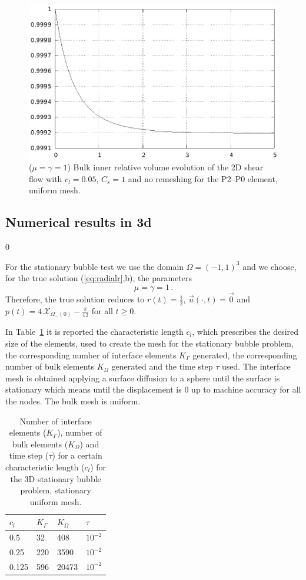 \documentclass[a4paper,12pt,onecolumn]{article}
\newcommand{\bigchi}{\ensuremath{\mathrm{\mathcal{X}}}}
\newcommand{\charfcn}[1]{\bigchi_{#1}} %
\begin{document}
\begin{figure}[htbp]
  \centering
  \includegraphics[width=.45\textwidth]{figures/2d_shear_smooth_bulk_inner_volume.ps}
  \caption{($\mu=\gamma=1$) Bulk inner relative volume evolution of the 2D shear flow with $c_l=0.05$, $C_s=1$ and no remeshing for the P2--P0 element, uniform mesh.}
  \label{fig:shear_2d_smooth_bulk_inner_volume}
\end{figure}

\subsection{Numerical results in 3d} \label{subsec:numerical_results_3d}
\setcounter{equation} 0

For the stationary bubble test we use the domain $\Omega = (-1,1)^3$ and we choose, for the true solution (\ref{eq:radialr},b), the parameters
\begin{equation*}
\mu = \gamma = 1\,. 
\end{equation*}
Therefore, the true solution reduces to $r(t) = \frac{1}{2}$, $\vec u(\cdot, t) = \vec 0$ and $p(t) = 4\,\charfcn{\Omega_-(0)} - \frac{\pi}{12}$ for all $t\geq0$.

In Table~\ref{tab:bubble3Delements} it is reported the characteristic length $c_l$, which prescribes the desired size of the elements, used to create the mesh for the stationary bubble problem, the corresponding number of interface elements $K_\Gamma$ generated, the corresponding number of bulk elements $K_\Omega$ generated and the time step $\tau$ used. The interface mesh is obtained applying a surface diffusion to a sphere until the surface is stationary which means until the displacement is 0 up to machine accuracy for all the nodes. The bulk mesh is uniform.
\begin{table}
 \center
\begin{tabular}{llll}
\hline
$c_l$ & $K_\Gamma$ & $K_\Omega$ & $\tau$ \\
\hline
0.5 & 32 & 408 & $10^{-2}$ \\
0.25 & 220 & 3590 & $10^{-2}$\\
0.125 & 596 & 20473 & $10^{-2}$\\
\hline
\end{tabular}
\caption{Number of interface elements ($K_\Gamma$), number of bulk elements ($K_\Omega$) and time step ($\tau$) for a certain characteristic length ($c_l$) for the 3D stationary bubble problem, stationary uniform mesh.}
\label{tab:bubble3Delements}
\end{table}
\end{document}
